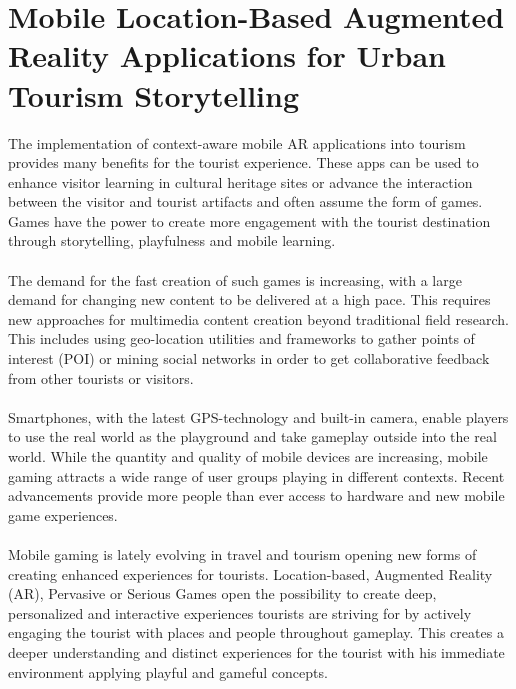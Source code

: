 \section{Mobile Location-Based Augmented Reality Applications for Urban Tourism Storytelling }

The implementation of context-aware mobile AR applications into tourism provides many beneﬁts for the tourist experience. These apps can be used to enhance visitor learning in cultural heritage sites or advance the interaction between the visitor and tourist artifacts and often assume the form of games. Games have the power to create more engagement with the tourist destination through storytelling, playfulness and mobile learning.
\paragraph{}The demand for the fast creation of such games is increasing, with a large demand for changing new content to be delivered at a high pace. This requires new approaches for multimedia content creation beyond traditional ﬁeld research. This includes using geo-location utilities and frameworks to gather points of interest (POI) or mining social networks in order to get collaborative feedback from other tourists or visitors.
\paragraph{}Smartphones, with the latest GPS-technology and built-in camera, enable players to use the real world as the playground and take gameplay outside into the real world. While the quantity and quality of mobile devices are increasing, mobile gaming attracts a wide range of user groups playing in different contexts. Recent advancements provide more people than ever access to hardware and new mobile game experiences. 
\paragraph{}Mobile gaming is lately evolving in travel and tourism opening new forms of creating enhanced experiences for tourists. Location-based, Augmented Reality (AR), Pervasive or Serious Games open the possibility to create deep, personalized and interactive experiences tourists are striving for by actively engaging the tourist with places and people throughout gameplay. This creates a deeper understanding and distinct experiences for the tourist with his immediate environment applying playful and gameful concepts. 

